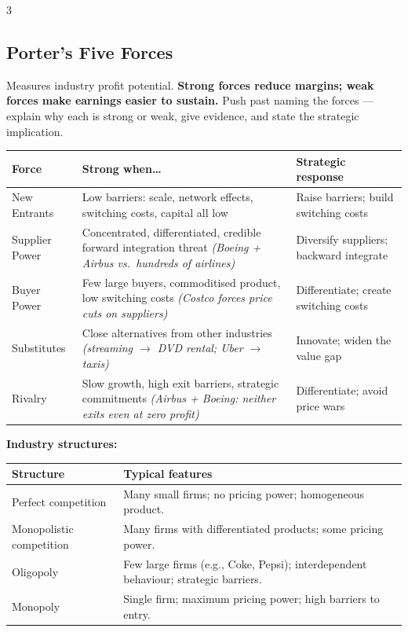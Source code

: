 \documentclass[7.6pt,letterpaper]{article}
\newcommand{\T}[1]{\textbf{\color{navy}#1}}
\newcommand{\kk}[2]{\noindent\T{#1}\ #2\par}
\newcommand{\eg}[1]{\textit{\color{mid}#1}}
\newcommand{\sh}{\rowcolor{strip}}
\newcommand{\ctab}[1]{{\fontsize{6.2pt}{7pt}\selectfont\setlength{\tabcolsep}{2.5pt}#1}}
\begin{document}
\begin{multicols}{3}
\subsection{Porter's Five Forces}

Measures industry profit potential. \T{Strong forces reduce margins; weak forces make earnings easier to sustain.} Push past naming the forces --- explain why each is strong or weak, give evidence, and state the strategic implication.

\ctab{\begin{tabular}{@{}p{1.4cm}p{2cm}p{2.2cm}@{}}
\toprule
\sh \T{Force} & \T{Strong when\dots} & \T{Strategic response} \\
\midrule
New Entrants & Low barriers: scale, network effects, switching costs, capital all low & Raise barriers; build switching costs \\
Supplier Power & Concentrated, differentiated, credible forward integration threat \eg{(Boeing + Airbus vs.\ hundreds of airlines)} & Diversify suppliers; backward integrate \\
Buyer Power & Few large buyers, commoditised product, low switching costs \eg{(Costco forces price cuts on suppliers)} & Differentiate; create switching costs \\
Substitutes & Close alternatives from other industries \eg{(streaming $\to$ DVD rental; Uber $\to$ taxis)} & Innovate; widen the value gap \\
Rivalry & Slow growth, high exit barriers, strategic commitments \eg{(Airbus + Boeing: neither exits even at zero profit)} & Differentiate; avoid price wars \\
\bottomrule
\end{tabular}}

\kk{Industry structures:}{}
\ctab{\begin{tabular}{@{}p{2.2cm}p{5.0cm}@{}}
\toprule
\sh \T{Structure} & \T{Typical features} \\
\midrule
Perfect competition & Many small firms; no pricing power; homogeneous product. \\
Monopolistic competition & Many firms with differentiated products; some pricing power. \\
Oligopoly & Few large firms (e.g., Coke, Pepsi); interdependent behaviour; strategic barriers. \\
Monopoly & Single firm; maximum pricing power; high barriers to entry. \\
\bottomrule
\end{tabular}}


\end{multicols}
\end{document}
